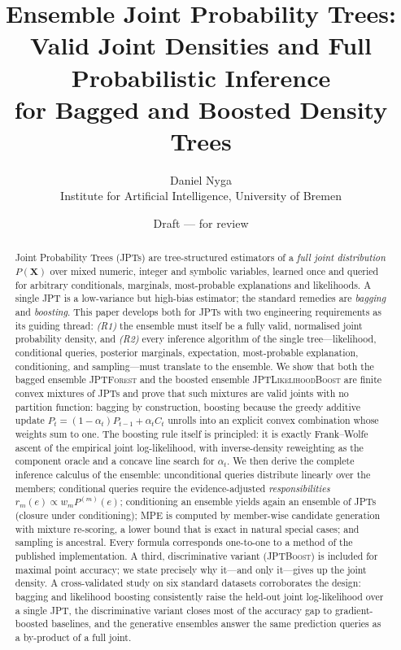\documentclass[11pt]{article}
\title{\textbf{Ensemble Joint Probability Trees:\\[2pt]
Valid Joint Densities and Full Probabilistic Inference\\
for Bagged and Boosted Density Trees}}
\author{Daniel Nyga\\[2pt]
\small Institute for Artificial Intelligence, University of Bremen}
\date{Draft --- for review}
\theoremstyle{plain}
\theoremstyle{definition}
\theoremstyle{remark}
\newcommand{\jptforest}{\textsc{JPTForest}}
\newcommand{\likeboost}{\textsc{JPTLikelihoodBoost}}
\newcommand{\jptboost}{\textsc{JPTBoost}}
\begin{document}
\maketitle

\begin{abstract}
Joint Probability Trees (JPTs) are tree-structured estimators of a
\emph{full joint distribution} $P(\mathbf{X})$ over mixed numeric, integer
and symbolic variables, learned once and queried for arbitrary
conditionals, marginals, most-probable explanations and likelihoods.
A single JPT is a low-variance but high-bias estimator; the standard
remedies are \emph{bagging} and \emph{boosting}. This paper develops both
for JPTs with two engineering requirements as its guiding thread:
\emph{(R1)} the ensemble must itself be a fully valid, normalised joint
probability density, and \emph{(R2)} every inference algorithm of the
single tree---likelihood, conditional queries, posterior marginals,
expectation, most-probable explanation, conditioning, and
sampling---must translate to the ensemble. We show that both the bagged
ensemble \jptforest{} and the boosted ensemble \likeboost{} are finite
convex mixtures of JPTs and prove that such mixtures are valid joints with
no partition function: bagging by construction, boosting because the
greedy additive update $P_t=(1-\alpha_t)P_{t-1}+\alpha_t C_t$ unrolls into
an explicit convex combination whose weights sum to one. The boosting rule
itself is principled: it is exactly Frank--Wolfe ascent of the empirical
joint log-likelihood, with inverse-density reweighting as the component
oracle and a concave line search for $\alpha_t$. We then derive the
complete inference calculus of the ensemble: unconditional queries
distribute linearly over the members; conditional queries require the
evidence-adjusted \emph{responsibilities} $r_m(e)\propto w_m P^{(m)}(e)$;
conditioning an ensemble yields again an ensemble of JPTs (closure under
conditioning); MPE is computed by member-wise candidate generation with
mixture re-scoring, a lower bound that is exact in natural special cases;
and sampling is ancestral. Every formula corresponds one-to-one to a
method of the published implementation. A third, discriminative variant
(\jptboost) is included for maximal point accuracy; we state precisely why
it---and only it---gives up the joint density. A cross-validated study on
six standard datasets corroborates the design: bagging and likelihood
boosting consistently raise the held-out joint log-likelihood over a
single JPT, the discriminative variant closes most of the accuracy gap to
gradient-boosted baselines, and the generative ensembles answer the same
prediction queries as a by-product of a full joint.
\end{abstract}
\end{document}
